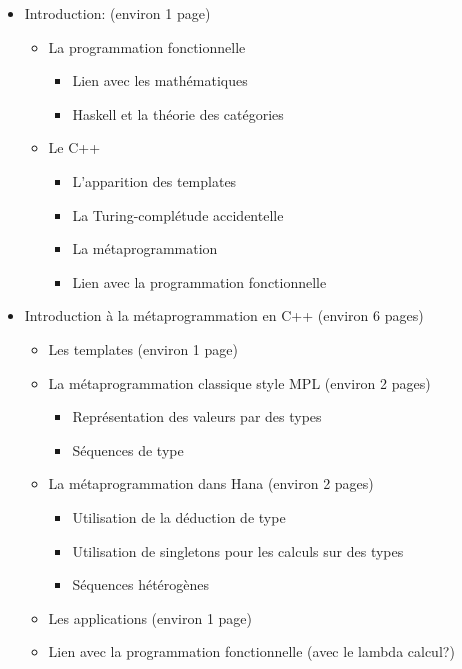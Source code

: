 \documentclass{article}
\begin{document}
\begin{itemize}
    \item Introduction: (environ 1 page)
        \begin{itemize}
            \item La programmation fonctionnelle
                \begin{itemize}
                    \item Lien avec les mathématiques
                    \item Haskell et la théorie des catégories
                \end{itemize}
            \item Le C++
                \begin{itemize}
                    \item L'apparition des templates
                    \item La Turing-complétude accidentelle
                    \item La métaprogrammation
                    \item Lien avec la programmation fonctionnelle
                \end{itemize}
        \end{itemize}

    \item Introduction à la métaprogrammation en C++ (environ 6 pages)
        \begin{itemize}
            \item Les templates (environ 1 page)
            \item La métaprogrammation classique style MPL (environ 2 pages)
                \begin{itemize}
                    \item Représentation des valeurs par des types
                    \item Séquences de type
                \end{itemize}
            \item La métaprogrammation dans Hana (environ 2 pages)
                \begin{itemize}
                    \item Utilisation de la déduction de type
                    \item Utilisation de singletons pour les calculs sur des types
                    \item Séquences hétérogènes
                \end{itemize}
            \item Les applications (environ 1 page)
            \item Lien avec la programmation fonctionnelle (avec le lambda calcul?)
        \end{itemize}


\end{itemize}
\end{document}
